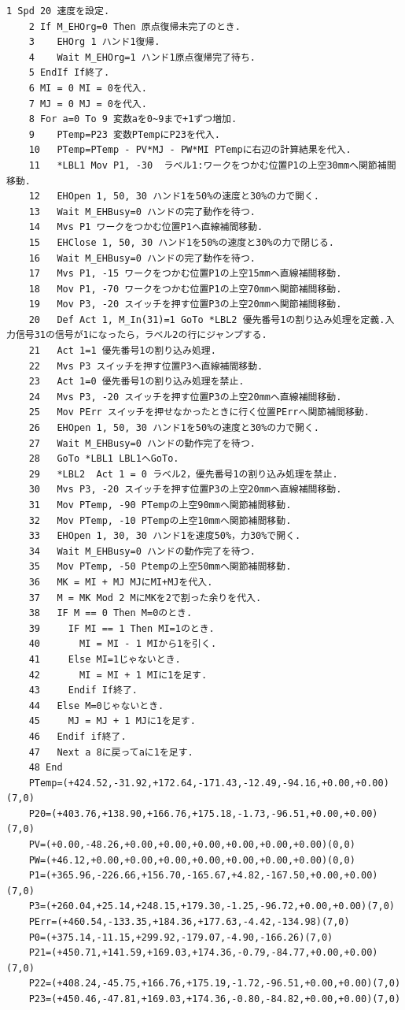 \documentclass[10pt,a4j]{jsarticle}
\begin{document}
  \begin{lstlisting}[caption=パターン4のソースコード, label=p4_txt]
    1 Spd 20 速度を設定.
    2 If M_EHOrg=0 Then 原点復帰未完了のとき.
    3    EHOrg 1 ハンド1復帰.
    4    Wait M_EHOrg=1 ハンド1原点復帰完了待ち.
    5 EndIf If終了.
    6 MI = 0 MI = 0を代入.
    7 MJ = 0 MJ = 0を代入.
    8 For a=0 To 9 変数aを0~9まで+1ずつ増加.
    9    PTemp=P23 変数PTempにP23を代入.
    10   PTemp=PTemp - PV*MJ - PW*MI PTempに右辺の計算結果を代入.
    11   *LBL1 Mov P1, -30	ラベル1:ワークをつかむ位置P1の上空30mmへ関節補間移動.
    12   EHOpen 1, 50, 30 ハンド1を50%の速度と30%の力で開く.
    13   Wait M_EHBusy=0 ハンドの完了動作を待つ.
    14   Mvs P1 ワークをつかむ位置P1へ直線補間移動.
    15   EHClose 1, 50, 30 ハンド1を50%の速度と30%の力で閉じる.
    16   Wait M_EHBusy=0 ハンドの完了動作を待つ.
    17   Mvs P1, -15 ワークをつかむ位置P1の上空15mmへ直線補間移動.
    18   Mov P1, -70 ワークをつかむ位置P1の上空70mmへ関節補間移動.
    19   Mov P3, -20 スイッチを押す位置P3の上空20mmへ関節補間移動.
    20   Def Act 1, M_In(31)=1 GoTo *LBL2 優先番号1の割り込み処理を定義.入力信号31の信号が1になったら，ラベル2の行にジャンプする.
    21   Act 1=1 優先番号1の割り込み処理.
    22   Mvs P3 スイッチを押す位置P3へ直線補間移動.
    23   Act 1=0 優先番号1の割り込み処理を禁止.
    24   Mvs P3, -20 スイッチを押す位置P3の上空20mmへ直線補間移動.
    25   Mov PErr スイッチを押せなかったときに行く位置PErrへ関節補間移動.
    26   EHOpen 1, 50, 30 ハンド1を50%の速度と30%の力で開く.
    27   Wait M_EHBusy=0 ハンドの動作完了を待つ.
    28   GoTo *LBL1 LBL1へGoTo.
    29   *LBL2  Act 1 = 0 ラベル2，優先番号1の割り込み処理を禁止.
    30   Mvs P3, -20 スイッチを押す位置P3の上空20mmへ直線補間移動.
    31   Mov PTemp, -90 PTempの上空90mmへ関節補間移動.
    32   Mov PTemp, -10 PTempの上空10mmへ関節補間移動.
    33   EHOpen 1, 30, 30 ハンド1を速度50%，力30%で開く.
    34   Wait M_EHBusy=0 ハンドの動作完了を待つ.
    35   Mov PTemp, -50 Ptempの上空50mmへ関節補間移動.
    36   MK = MI + MJ MJにMI+MJを代入.
    37   M = MK Mod 2 MにMKを2で割った余りを代入.
    38   IF M == 0 Then M=0のとき.
    39     IF MI == 1 Then MI=1のとき.
    40       MI = MI - 1 MIから1を引く.
    41     Else MI=1じゃないとき.
    42       MI = MI + 1 MIに1を足す.
    43     Endif If終了.
    44   Else M=0じゃないとき.
    45     MJ = MJ + 1 MJに1を足す.
    46   Endif if終了.
    47   Next a 8に戻ってaに1を足す.
    48 End
    PTemp=(+424.52,-31.92,+172.64,-171.43,-12.49,-94.16,+0.00,+0.00)(7,0)
    P20=(+403.76,+138.90,+166.76,+175.18,-1.73,-96.51,+0.00,+0.00)(7,0)
    PV=(+0.00,-48.26,+0.00,+0.00,+0.00,+0.00,+0.00,+0.00)(0,0)
    PW=(+46.12,+0.00,+0.00,+0.00,+0.00,+0.00,+0.00,+0.00)(0,0)
    P1=(+365.96,-226.66,+156.70,-165.67,+4.82,-167.50,+0.00,+0.00)(7,0)
    P3=(+260.04,+25.14,+248.15,+179.30,-1.25,-96.72,+0.00,+0.00)(7,0)
    PErr=(+460.54,-133.35,+184.36,+177.63,-4.42,-134.98)(7,0)
    P0=(+375.14,-11.15,+299.92,-179.07,-4.90,-166.26)(7,0)
    P21=(+450.71,+141.59,+169.03,+174.36,-0.79,-84.77,+0.00,+0.00)(7,0)
    P22=(+408.24,-45.75,+166.76,+175.19,-1.72,-96.51,+0.00,+0.00)(7,0)
    P23=(+450.46,-47.81,+169.03,+174.36,-0.80,-84.82,+0.00,+0.00)(7,0)

  \end{lstlisting}
\end{document}

